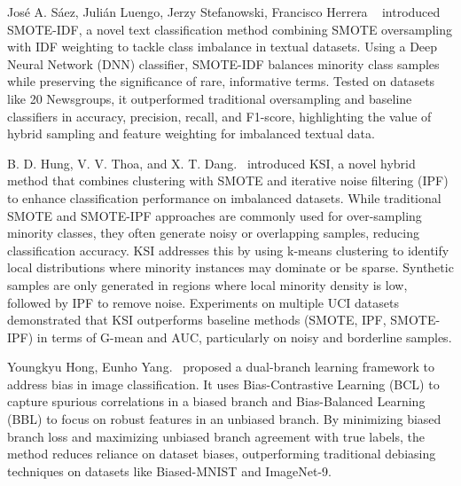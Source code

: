 \documentclass[conference]{IEEEtran}
\begin{document}
José A. Sáez, Julián Luengo, Jerzy Stefanowski, Francisco Herrera ~\cite{b2} introduced SMOTE-IDF, a novel text classification method combining SMOTE oversampling with IDF weighting to tackle class imbalance in textual datasets. Using a Deep Neural Network (DNN) classifier, SMOTE-IDF balances minority class samples while preserving the significance of rare, informative terms. Tested on datasets like 20 Newsgroups, it outperformed traditional oversampling and baseline classifiers in accuracy, precision, recall, and F1-score, highlighting the value of hybrid sampling and feature weighting for imbalanced textual data.


B. D. Hung, V. V. Thoa, and X. T. Dang.~\cite{b4} introduced KSI, a novel hybrid method that combines clustering with SMOTE and iterative noise filtering (IPF) to enhance classification performance on imbalanced datasets. While traditional SMOTE and SMOTE-IPF approaches are commonly used for over-sampling minority classes, they often generate noisy or overlapping samples, reducing classification accuracy. KSI addresses this by using k-means clustering to identify local distributions where minority instances may dominate or be sparse. Synthetic samples are only generated in regions where local minority density is low, followed by IPF to remove noise. Experiments on multiple UCI datasets demonstrated that KSI outperforms baseline methods (SMOTE, IPF, SMOTE-IPF) in terms of G-mean and AUC, particularly on noisy and borderline samples.

Youngkyu Hong, Eunho Yang.~\cite{b5} proposed a dual-branch learning framework to address bias in image classification. It uses Bias-Contrastive Learning (BCL) to capture spurious correlations in a biased branch and Bias-Balanced Learning (BBL) to focus on robust features in an unbiased branch. By minimizing biased branch loss and maximizing unbiased branch agreement with true labels, the method reduces reliance on dataset biases, outperforming traditional debiasing techniques on datasets like Biased-MNIST and ImageNet-9.
\end{document}
